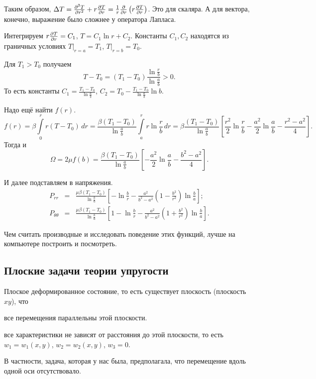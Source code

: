 Таким образом, $\Delta T = \frac{\partial ^2T}{\partial r^2} + r\frac{\partial T}{\partial r} = \frac1r\frac{\partial  }{\partial r}\left( r\frac{\partial T}{\partial r} \right)$. Это для скаляра. А для вектора, конечно, выражение было сложнее у оператора Лапласа.

Интегрируем $r\frac{\partial T}{\partial r} = C_1$, $T = C_1\ln r + C_2$. Константы $C_1,C_2$ находятся из граничных условиях $T|_{r=a} = T_1$, $T|_{r=b} = T_0$.

Для $T_1>T_0$ получаем
\[
  T- T_0 = (T_1 - T_0) \frac{\ln\frac rb}{\ln\frac ab}>0.
\]
То есть константы $C_1 = \frac{ T_1 - T_0}{\ln\frac ab}$, $C_2 = T_0 - \frac{T_1-T_0}{\ln\frac ab}\ln b$.

Надо ещё найти $f(r)$.
\[
  f(r) = \beta\int\limits_0^r r(T-T_0)\,dr = 
 \frac{\beta(T_1-T_0)}{\ln\frac ab}\int\limits_a^r r\ln\frac rb\,dr =
  \beta\frac{(T_1-T_0)}{\ln\frac ab}\left[ 
    \frac{r^2}2\ln\frac rb - \frac{a^2}2\ln\frac ab - \frac{r^2-a^2}4
   \right].
\]
Тогда и 
\[
  \Omega = 2\mu f(b) = \frac{\beta(T_1 - T_0)}{\ln\frac ab} \left[ 
    -\frac{a^2}2\ln\frac ab - \frac{b^2-a^2}4
   \right].
\]

И далее подставляем в напряжения.
\begin{eqnarray*}
  P_{rr} &=& \frac{\mu \beta(T_1-T_0)}{\ln\frac ba}\left[ 
    -\ln\frac br - \frac{a^2}{b^2-a^2}\left( 1-\frac{b^2}{r^2} \right)\ln\frac ba
   \right];\\
  P_{\theta\theta} &=& \frac{\mu \beta(T_1-T_0)}{\ln\frac ba}\left[ 
    1 - \ln\frac br - \frac{a^2}{b^2-a^2}\left( 1+\frac{b^2}{r^2} \right)\ln\frac ba
   \right].
\end{eqnarray*}

Чем считать производные и исследовать поведение этих функций, лучше на компьютере построить и посмотреть.
\subsection{Плоские задачи теории упругости}
Плоское деформированное состояние, то есть существует плоскость (плоскость $xy$), что 
\begin{roItems}
\item все перемещения параллельны этой плоскости.
\item все характеристики не зависят от расстояния до этой плоскости, то есть $w_1=w_1(x,y)$, $w_2 = w_2(x,y)$, $w_3=0$.
\end{roItems}

В частности, задача, которая у нас была, предполагала, что перемещение вдоль одной оси отсутствовало.


